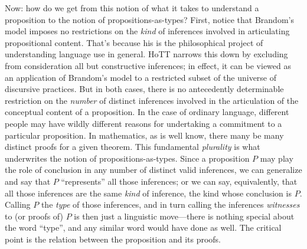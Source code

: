 Now: how do we get from this notion of what it takes to understand a
proposition to the notion of propositions-as-types?  First, notice
that Brandom's model imposes no restrictions on the \textit{kind} of
inferences involved in articulating propositional content.  That's
because his is the philosophical project of understanding language use
in general.  HoTT narrows this down by excluding from consideration
all but constructive inferences; in effect, it can be viewed as an
application of Brandom's model to a restricted subset of the universe
of discursive practices.  But in both cases, there is no antecedently
determinable restriction on the \textit{number} of distinct inferences
involved in the articulation of the conceptual content of a
proposition. In the
case of ordinary language, different people may have wildly different
reasons for undertaking a commitment to a particular proposition.  In
mathematics, as is well know, there many be many distinct proofs for a
given theorem.  This fundamental \textit{plurality} is what
underwrites the notion of propositions-as-types.  Since a proposition
\(P\) may play the role of conclusion in any number of distinct valid
inferences, we can generalize and say that \(P\) ``represents'' all
those inferences; or we can say, equivalently, that all those
inferences are the same \textit{kind} of inference, the kind whose
conclusion is \(P\).  Calling \(P\) the \textit{type} of those
inferences, and in turn calling the inferences \textit{witnesses} to
(or proofs of) \(P\) is then just a linguistic move---there is nothing
special about the word ``type'', and any similar word would have done
as well.  The critical point is the relation between the proposition
and its proofs.

